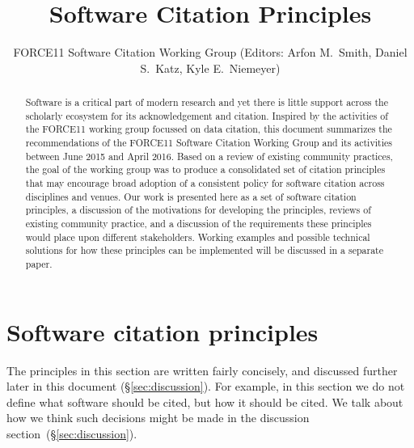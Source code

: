 \documentclass[11pt, oneside]{amsart}
\title{Software Citation Principles}
\author{FORCE11 Software Citation Working Group (Editors: Arfon M.~Smith, Daniel S.~Katz, Kyle E.~Niemeyer)}
\date{}
\newcommand{\katznote}[1]{ {\textcolor{blue} { ***DSK: #1 }}} %
\begin{document}
\begin{abstract}

Software is a critical part of modern research and yet there is little support across the scholarly ecosystem for its acknowledgement and citation.
Inspired by the activities of the FORCE11 working group focussed on data citation, this document summarizes the recommendations of the FORCE11 Software Citation Working Group and its activities between June 2015 and April 2016.
Based on a review of existing community practices, the goal of the working group was to produce a consolidated set of citation principles that may encourage broad adoption of a consistent policy for software citation across disciplines and venues.
Our work is presented here as a set of software citation principles, a discussion of the motivations for developing the principles, reviews of existing community practice, and a discussion of the requirements these principles would place upon different stakeholders.
Working examples and possible technical solutions for how these principles can be implemented will be discussed in a separate paper.

\end{abstract}

\maketitle


\section{Software citation principles}
\label{sec:principles}

The principles in this section are written fairly concisely, and discussed
further later in this document (\S\ref{sec:discussion}). For example, in this
section we do not define what software should be cited, but how it should be
cited.  We talk about how we think such decisions might be made in the
discussion section~(\S\ref{sec:discussion}).

\end{document}
